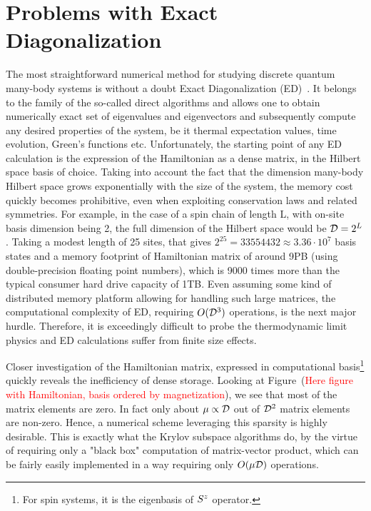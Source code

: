 \section{Problems with Exact Diagonalization}
  The most straightforward numerical method for studying discrete quantum many-body systems is without a doubt
 Exact Diagonalization (ED)~\autocite{Weisse2008}. It belongs to the family of the so-called direct algorithms and
allows one to obtain numerically exact set of eigenvalues and eigenvectors and subsequently compute any desired properties
 of the system, be it thermal expectation values, time evolution, Green's functions etc. Unfortunately, the starting point of any
 ED calculation is the expression of the Hamiltonian as a dense matrix, in the Hilbert space basis of choice. Taking into account
 the fact that the dimension many-body Hilbert space grows exponentially with the size of the system, the memory cost quickly becomes
 prohibitive, even when exploiting conservation laws and related symmetries. For example, in the case of a spin chain of length L, with 
 on-site basis dimension being 2, the full dimension of the Hilbert space would be \(\mathcal{D} = 2^{L}\). Taking a modest length of 25 sites, that gives
 \(2^{25} = 33554432\approx 3.36 \cdot 10^7\) basis states and a memory footprint of Hamiltonian matrix of around 9PB (using double-precision
 floating point numbers), which is 9000 times more than the typical consumer hard drive capacity of 1TB. Even assuming some kind of distributed
 memory platform allowing for handling such large matrices, the computational complexity of ED, requiring \(O(\mathcal{D}^3)\) operations,
 is the next major hurdle. Therefore, it is exceedingly
 difficult to probe the thermodynamic limit physics and ED calculations suffer from finite size effects.
 
 Closer investigation of the Hamiltonian matrix, expressed in computational basis\footnote{For spin systems, it is the eigenbasis of \(S^{z}\) operator.}
 quickly reveals the inefficiency of dense storage. Looking at Figure~(\textcolor{red}{Here figure with Hamiltonian, basis ordered by magnetization}), we see that most of
 the matrix elements are zero. In fact only about \(\mu \propto \mathcal{D} \) out of \(\mathcal{D}^2\) matrix elements
 are non-zero. Hence, a numerical scheme leveraging this sparsity is highly desirable. This is exactly what the Krylov subspace algorithms
 do, by the virtue of requiring only a "black box" computation of matrix-vector product, which can be fairly easily implemented in a way
 requiring only \(O(\mu \mathcal{D})\) operations.

